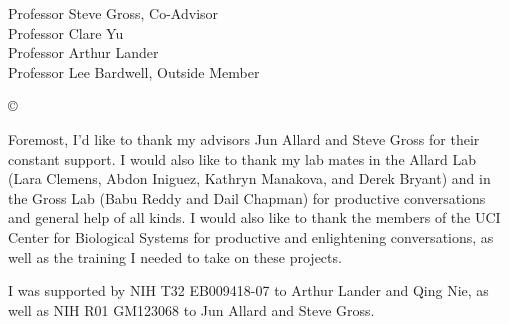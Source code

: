 



\othercommitteemembers
{
  Professor Steve Gross, Co-Advisor\\
  Professor Clare Yu\\
  Professor Arthur Lander\\
  Professor Lee Bardwell, Outside Member
}


\copyrightdeclaration
{
  {\copyright} {\Degreeyear} \Authorname
}


%

\acknowledgments
{
Foremost, I'd like to thank my advisors Jun Allard and Steve Gross for their constant support. I would also like to thank my lab mates in the Allard Lab (Lara Clemens, Abdon Iniguez, Kathryn Manakova, and Derek Bryant) and in the Gross Lab (Babu Reddy and Dail Chapman) for productive conversations and general help of all kinds. I would also like to thank the members of the UCI Center for Biological Systems for productive and enlightening conversations, as well as the training I needed to take on these projects.

I was supported by NIH T32 EB009418-07 to Arthur Lander and Qing Nie, as well as NIH R01 GM123068 to Jun Allard and Steve Gross.
}


